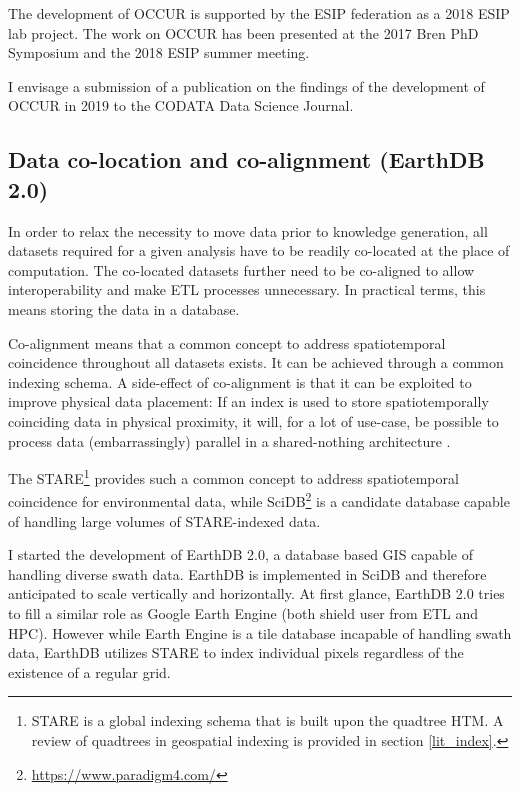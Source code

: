 \documentclass[letterpaper, parskip=half]{scrartcl}
\begin{document}
The development of \gls{OCCUR} is supported by the \gls{ESIP} federation as a 2018 \gls{ESIP} lab project. The work on \gls{OCCUR} has been presented at the 2017 Bren PhD Symposium and the 2018 \gls{ESIP} summer meeting.

I envisage a submission of a publication on the findings of the development of OCCUR in 2019 to the CODATA Data Science Journal.

\newpage

\subsection{Data co-location and co-alignment (EarthDB 2.0)}
In order to relax the necessity to move data prior to knowledge generation, all datasets required for a given analysis have to be readily co-located at the place of computation. The co-located datasets further need to be co-aligned to allow interoperability \citep{Kuo2017, Rilee2016} and make \gls{ETL} processes unnecessary. In practical terms, this means storing the data in a database.

Co-alignment means that a common concept to address spatiotemporal coincidence throughout all datasets exists. It can be achieved through a common indexing schema. A side-effect of co-alignment is that it can be exploited to improve physical data placement: If an index is used to store spatiotemporally coinciding data in physical proximity, it will, for a lot of use-case, be possible to process data (embarrassingly) parallel in a shared-nothing architecture \citep{Kuo2017}.

The \gls{STARE}\footnote{STARE is a global indexing schema that is built upon the quadtree \gls{HTM}. A review of quadtrees in geospatial indexing is provided in section \ref{lit_index}.} \citep{Kuo2017} provides such a common concept to address spatiotemporal coincidence for environmental data, while SciDB\footnote{\url{https://www.paradigm4.com/}} is a candidate database capable of handling large volumes of \gls{STARE}-indexed data.

I started the development of EarthDB 2.0, a database based \gls{GIS} capable of handling diverse swath data. 
EarthDB is implemented in SciDB and therefore anticipated to scale vertically and horizontally.
At first glance, EarthDB 2.0 tries to fill a similar role as Google Earth Engine \citep{Gorelick2017} (both shield user from \gls{ETL} and \gls{HPC}). However while Earth Engine is a tile database incapable of handling swath data, EarthDB utilizes STARE to index individual pixels regardless of the existence of a regular grid. 
\end{document}
